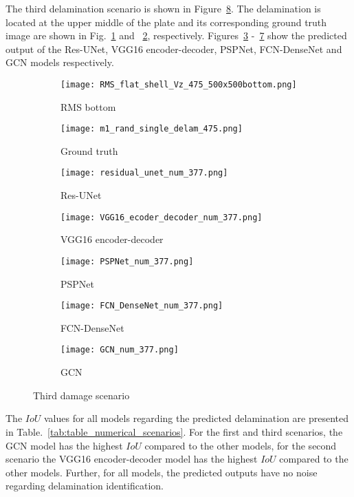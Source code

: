 \clearpage
The third delamination scenario is shown in Figure~\ref{fig:475_softmax}. 
The delamination is located at the upper middle of the plate and its corresponding ground truth image are shown in Fig.~\ref{fig:RMS_flat_shell_Vz_475} and ~\ref{fig:m1_rand_single_delam_475}, respectively. 
Figures~\ref{fig:Unet_Pred__softmax_475} -~\ref{fig:gcn_pred_475} show the predicted output of the Res-UNet, VGG16 encoder-decoder, PSPNet, FCN-DenseNet and GCN models respectively. 
\begin{figure}[!h]
	\centering
	\begin{subfigure}[b]{0.47\textwidth}
		\centering
		\texttt{[image: RMS\_flat\_shell\_Vz\_475\_500x500bottom.png]}
		\caption{RMS bottom}
		\label{fig:RMS_flat_shell_Vz_475}
	\end{subfigure}
	\hfill
	\begin{subfigure}[b]{0.47\textwidth}
		\centering
		\texttt{[image: m1\_rand\_single\_delam\_475.png]}
		\caption{Ground truth}
		\label{fig:m1_rand_single_delam_475}
	\end{subfigure}
	\begin{subfigure}[b]{0.47\textwidth}
		\centering
		\texttt{[image: residual\_unet\_num\_377.png]}
		\caption{Res-UNet}
		\label{fig:Unet_Pred__softmax_475}
	\end{subfigure}
	\hfill
	\begin{subfigure}[b]{0.47\textwidth}
		\centering
		\texttt{[image: VGG16\_ecoder\_decoder\_num\_377.png]}
		\caption{VGG16 encoder-decoder}			\label{fig:vgg16_pred__softmax_475}			
	\end{subfigure}
	\hfill
	\begin{subfigure}[b]{0.47\textwidth}
		\centering
		\texttt{[image: PSPNet\_num\_377.png]}
		\caption{PSPNet}
		\label{fig:pspnet_pred__softmax_475}
	\end{subfigure}	
	\hfill
	\begin{subfigure}[b]{0.47\textwidth}
		\centering
		\texttt{[image: FCN\_DenseNet\_num\_377.png]}
		\caption{FCN-DenseNet}
		\label{fig:fcn_densenet_pred__softmax_475}
	\end{subfigure}
	\hfill
	\begin{subfigure}[b]{0.47\textwidth}
		\centering
		\texttt{[image: GCN\_num\_377.png]}
		\caption{GCN}
		\label{fig:gcn_pred_475}
	\end{subfigure}	
	\caption{Third damage scenario}
	\label{fig:475_softmax}
\end{figure}
\clearpage
The \(IoU\) values for all models regarding the predicted delamination are presented in Table.~\ref{tab:table_numerical_scenarios}.
For the first and third scenarios, the GCN model has the highest \(IoU\) compared to the other models, for the second scenario the VGG16 encoder-decoder model has the highest \(IoU\) compared to the other models.
Further, for all models, the predicted outputs have no noise regarding delamination identification.

